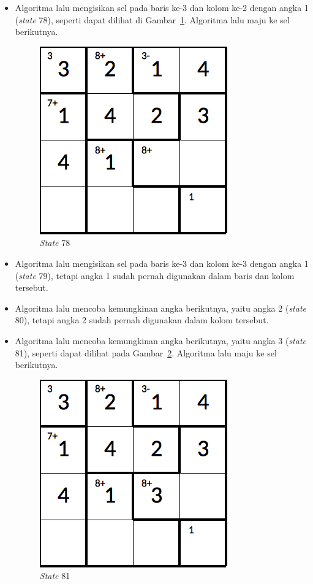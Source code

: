 \documentclass[a4paper,twoside]{article}
\begin{document}
\begin{enumerate}
\begin{itemize}
\item Algoritma lalu mengisikan sel pada baris ke-3 dan kolom ke-2 dengan angka 1 (\textit{state} 78), seperti dapat dilihat di Gambar~\ref{fig:analisisbt26}. Algoritma lalu maju ke sel berikutnya.

\begin{figure}
\centering
\captionsetup{justification=centering}
\includegraphics[scale=0.333]{Gambar/backtracking/State78}
\caption[\textit{State} 78]{\textit{State} 78}
\label{fig:analisisbt26}
\end{figure}

\item Algoritma lalu mengisikan sel pada baris ke-3 dan kolom ke-3 dengan angka 1 (\textit{state} 79), tetapi angka 1 sudah pernah digunakan dalam baris dan kolom tersebut.
\item Algoritma lalu mencoba kemungkinan angka berikutnya, yaitu angka 2 (\textit{state} 80), tetapi angka 2 sudah pernah digunakan dalam kolom tersebut.
\item Algoritma lalu mencoba kemungkinan angka berikutnya, yaitu angka 3 (\textit{state} 81), seperti dapat dilihat pada Gambar~\ref{fig:analisisbt27}. Algoritma lalu maju ke sel berikutnya.

\begin{figure}
\centering
\captionsetup{justification=centering}
\includegraphics[scale=0.333]{Gambar/backtracking/State81}
\caption[\textit{State} 81]{\textit{State} 81}
\label{fig:analisisbt27}
\end{figure}


\end{itemize}
\end{enumerate}
\end{document}
